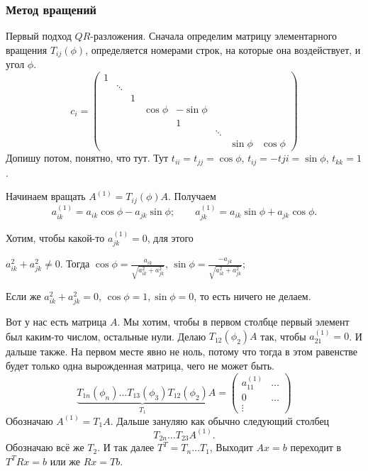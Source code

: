 \subsubsection{Метод вращений}
Первый подход $QR$-разложения. Сначала определим матрицу элементарного вращения $T_{ij}(\phi)$, определяется номерами строк, на которые она воздействует, и угол $\phi$.
\[
 c_i = \begin{pmatrix}
  1 \\
  & \ddots \\
  & & 1\\
  & & & \cos\phi & -\sin\phi\\
  & & & & 1\\
  & & & & & \ddots\\
  & & & & & & \sin\phi & \cos\phi
\end{pmatrix}
\]
Допишу потом, понятно, что тут. Тут $t_{ii} = t_{jj} = \cos\phi$, $t_{ij} = -t{ji} = \sin\phi$, $t_{kk}=1$.

Начинаем вращать $A^{(1)} = T_{ij}(\phi)A$. Получаем
\[
  a_{ik}^{(1)} = a_{ik} \cos\phi - a_{jk} \sin\phi;\qquad
  a_{jk}^{(1)} = a_{ik}\sin\phi + a_{jk} \cos\phi.
\]

Хотим, чтобы какой-то $a_{jk}^{(1)} = 0$, для этого
\begin{roItems}
\item $a_{ik}^2 + a_{jk}^2\ne 0$. Тогда $\cos\phi = \frac{ a_{ik}}{\sqrt{a_{ik}^2+ a_{jk}^2}}$, $\sin\phi = \frac{-a_{jk}}{\sqrt{a_{ik}^2 + a_{jk}^2}}$;
\item Если же $a_{ik}^2 + a_{jk}^2 = 0$, $\cos\phi = 1, \sin \phi = 0$, то есть ничего не делаем.
\end{roItems}

Вот у нас есть матрица $A$. Мы хотим, чтобы в первом столбце первый элемент был каким-то числом, остальные нули. Делаю $T_{12}(\phi_2) A$ так, чтобы $a_{21}^{(1)} = 0$. И дальше также. На первом месте явно не ноль, потому что тогда в этом равенстве будет только одна вырожденная матрица, чего не может быть.
\[
  \underbrace{T_{1n}(\phi_n)\dots T_{13}(\phi_3)T_{12}(\phi_2)}_{T_1} A = 
\begin{pmatrix}
  a_{11}^{(1)} & \dots\\
  0 & \dots\\
  \vdots
\end{pmatrix}
\]
Обозначаю $A^{(1)} = T_1 A$. Дальше зануляю как обычно следующий столбец
\[
  T_{2n}\dots T_{23} A^{(1)}.
\]
Обозначаю всё же $T_2$. И так далее $T^T = T_n\dots T_1$, Выходит $Ax = b$ переходит в $T^TRx = b$ или же $Rx = Tb$.

